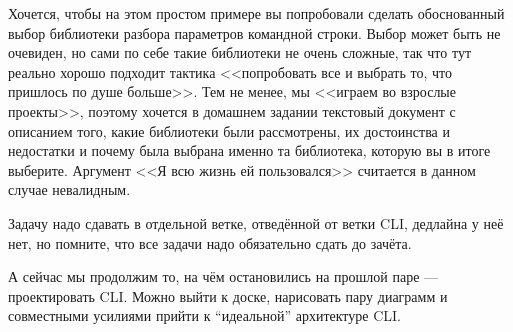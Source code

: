 \documentclass[a5paper]{article}
\begin{document}
Хочется, чтобы на этом простом примере вы попробовали сделать обоснованный выбор библиотеки разбора параметров командной строки. Выбор может быть не очевиден, но сами по себе такие библиотеки не очень сложные, так что тут реально хорошо подходит тактика <<попробовать все и выбрать то, что пришлось по душе больше>>. Тем не менее, мы <<играем во взрослые проекты>>, поэтому хочется в домашнем задании текстовый документ с описанием того, какие библиотеки были рассмотрены, их достоинства и недостатки и почему была выбрана именно та библиотека, которую вы в итоге выберите. Аргумент <<Я всю жизнь ей пользовался>> считается в данном случае невалидным.

Задачу надо сдавать в отдельной ветке, отведённой от ветки CLI, дедлайна у неё нет, но помните, что все задачи надо обязательно сдать до зачёта.

А сейчас мы продолжим то, на чём остановились на прошлой паре --- проектировать CLI. Можно выйти к доске, нарисовать пару диаграмм и совместными усилиями прийти к ``идеальной'' архитектуре CLI.
\end{document}
